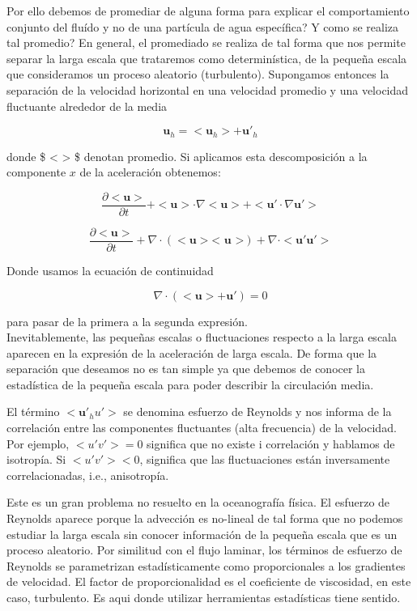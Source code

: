 \documentclass[
]{agujournal2019}
\begin{document}
Por ello debemos de promediar de alguna forma para explicar el
comportamiento conjunto del fluído y no de una partícula de agua
específica? Y como se realiza tal promedio? En general, el promediado se
realiza de tal forma que nos permite separar la larga escala que
trataremos como determinística, de la pequeña escala que consideramos un
proceso aleatorio (turbulento). Supongamos entonces la separación de la
velocidad horizontal en una velocidad promedio y una velocidad
fluctuante alrededor de la media

\[{\mathbf u_h} = <{\mathbf u_h}> + {\mathbf u'_h} \]

donde \$ \textless{} \textgreater{} \$ denotan promedio. Si aplicamos
esta descomposición a la componente \(x\) de la aceleración obtenemos:

\begin{equation}
\frac{\partial <\mathbf {u}>}{\partial t} +  <{\mathbf u}> \cdot  {\nabla} <{\mathbf u} >  + < {\mathbf u'} \cdot {\nabla} \mathbf {u}'> 
\end{equation}

\begin{equation}
 \frac{\partial \mathbf {< u >}}{\partial t} + \nabla \cdot (<{\mathbf u}> \textbf {< u >}) + \nabla \cdot< \mathbf {u'} \mathbf {u}' >
\end{equation}

Donde usamos la ecuación de continuidad

\[ \nabla \cdot (< \mathbf {u} > + \mathbf {u}') =0 \]

para pasar de la primera a la segunda expresión.\\

Inevitablemente, las pequeñas escalas o fluctuaciones respecto a la
larga escala aparecen en la expresión de la aceleración de larga escala.
De forma que la separación que deseamos no es tan simple ya que debemos
de conocer la estadística de la pequeña escala para poder describir la
circulación media.

El término \(<\textbf {u}'_h u'>\) se denomina esfuerzo de Reynolds y
nos informa de la correlación entre las componentes fluctuantes (alta
frecuencia) de la velocidad. Por ejemplo, \(<u'v'> = 0\) significa que
no existe i correlación y hablamos de isotropía. Si \(<u'v'> < 0\),
significa que las fluctuaciones están inversamente correlacionadas,
i.e., anisotropía.

Este es un gran problema no resuelto en la oceanografía física. El
esfuerzo de Reynolds aparece porque la advección es no-lineal de tal
forma que no podemos estudiar la larga escala sin conocer información de
la pequeña escala que es un proceso aleatorio. Por similitud con el
flujo laminar, los términos de esfuerzo de Reynolds se parametrizan
estadísticamente como proporcionales a los gradientes de velocidad. El
factor de proporcionalidad es el coeficiente de viscosidad, en este
caso, turbulento. Es aqui donde utilizar herramientas estadísticas tiene
sentido.
\end{document}

